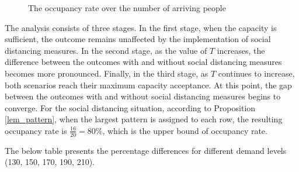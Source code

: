 \begin{figure}[h]
  \centering
  \caption{The occupancy rate over the number of arriving people}
\end{figure}

The analysis consists of three stages. 
In the first stage, when the capacity is sufficient, the outcome remains unaffected by the implementation of social distancing measures. In the second stage, as the value of $T$ increases, the difference between the outcomes with and without social distancing measures becomes more pronounced. Finally, in the third stage, as $T$ continues to increase, both scenarios reach their maximum capacity acceptance. At this point, the gap between the outcomes with and without social distancing measures begins to converge. For the social distancing situation, according to Proposition \ref{lem_pattern}, when the largest pattern is assigned to each row, the resulting occupancy rate is $\frac{16}{20} = 80\%$, which is the upper bound of occupancy rate.


The below table presents the percentage differences for different demand levels (130, 150, 170, 190, 210).



